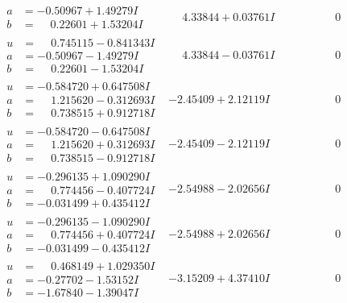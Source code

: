 \documentclass[1p]{elsarticle_modified}
\theoremstyle{definition}
\begin{document}
$$\begin{array}{c|c|c}
\begin{aligned}
a &= -0.50967 + 1.49279 I \\
b &= \phantom{-}0.22601 + 1.53204 I\end{aligned}
 & \phantom{-}4.33844 + 0.03761 I & \phantom{-0.000000 } 0 \\ \hline\begin{aligned}
u &= \phantom{-}0.745115 - 0.841343 I \\
a &= -0.50967 - 1.49279 I \\
b &= \phantom{-}0.22601 - 1.53204 I\end{aligned}
 & \phantom{-}4.33844 - 0.03761 I & \phantom{-0.000000 } 0 \\ \hline\begin{aligned}
u &= -0.584720 + 0.647508 I \\
a &= \phantom{-}1.215620 - 0.312693 I \\
b &= \phantom{-}0.738515 + 0.912718 I\end{aligned}
 & -2.45409 + 2.12119 I & \phantom{-0.000000 } 0 \\ \hline\begin{aligned}
u &= -0.584720 - 0.647508 I \\
a &= \phantom{-}1.215620 + 0.312693 I \\
b &= \phantom{-}0.738515 - 0.912718 I\end{aligned}
 & -2.45409 - 2.12119 I & \phantom{-0.000000 } 0 \\ \hline\begin{aligned}
u &= -0.296135 + 1.090290 I \\
a &= \phantom{-}0.774456 - 0.407724 I \\
b &= -0.031499 + 0.435412 I\end{aligned}
 & -2.54988 - 2.02656 I & \phantom{-0.000000 } 0 \\ \hline\begin{aligned}
u &= -0.296135 - 1.090290 I \\
a &= \phantom{-}0.774456 + 0.407724 I \\
b &= -0.031499 - 0.435412 I\end{aligned}
 & -2.54988 + 2.02656 I & \phantom{-0.000000 } 0 \\ \hline\begin{aligned}
u &= \phantom{-}0.468149 + 1.029350 I \\
a &= -0.27702 - 1.53152 I \\
b &= -1.67840 - 1.39047 I\end{aligned}
 & -3.15209 + 4.37410 I & \phantom{-0.000000 } 0 \\ \hline\begin{aligned}

\end{aligned}
\end{array}$$
\end{document}
